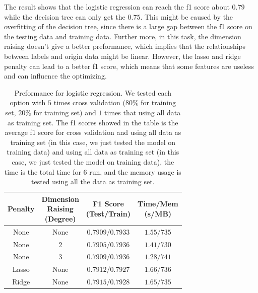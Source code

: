 \documentclass[11pt]{article}
\begin{document}
The result shows that the logistic regression can reach the f1 score about $0.79$ while the decision tree can only get the $0.75$. This might be caused by the overfitting of the decision tree, since there is a large gap between the f1 score on the testing data and training data. Further more, in this task, the dimension raising doesn't give a better preformance, which implies that the relationships between labels and origin data might be linear. However, the lasso and ridge penalty can lead to a better f1 score, which means that some features are useless and can influence the optimizing.

\begin{table}[H]
  \centering
  \begin{tabular}{|c|c|c|c|}
    \hline
    Penalty & \makecell{Dimension                                \\ Raising \\ (Degree)} & \makecell{F1 Score \\ (Test/Train)} & \makecell{Time/Mem \\ (s/MB)} \\
    \hline
    None    & None                & $0.7909/0.7933$ & $1.55/735$ \\
    \hline
    None    & $2$                 & $0.7905/0.7936$ & $1.41/730$ \\
    \hline
    None    & $3$                 & $0.7909/0.7936$ & $1.28/741$ \\
    \hline
    Lasso   & None                & $0.7912/0.7927$ & $1.66/736$ \\
    \hline
    Ridge   & None                & $0.7915/0.7928$ & $1.65/735$ \\
    \hline
  \end{tabular}
  \caption{Preformance for logistic regression. We tested each option with $5$ times cross validation ($80\%$ for training set, $20\%$ for training set) and $1$ times that using all data as training set. The f1 scores showed in the table is the average f1 score for cross validation and using all data as training set (in this case, we just tested the model on training data) and using all data as training set (in this case, we just tested the model on training data), the time is the total time for $6$ run, and the memory usage is tested using all the data as training set.}
  \label{task-1-result-1}
\end{table}
\end{document}

